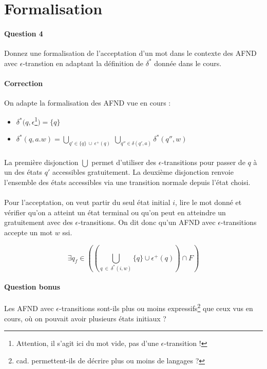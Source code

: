 \documentclass{article}[11pt]
\theoremstyle{definition}
\begin{document}
\section{Formalisation}

\paragraph*{Question 4} Donnez une formalisation de l'acceptation d'un mot dans le contexte des AFND avec $\epsilon$-transtion en adaptant la définition de $\delta^*$ donnée dans le cours.

\paragraph*{Correction} On adapte la formalisation des AFND vue en cours :
 
\begin{itemize}
\item $\delta^*(q,\epsilon$\footnote{Attention, il s'agit ici du mot vide, pas d'une $\epsilon$-transition !}$) = \{q\}$
\item $\delta^*(q,a.w) = \displaystyle\bigcup_{q' \in \{q\}~\cup~ \epsilon^+(q)}~\displaystyle\bigcup_{q'' \in \delta(q',a)} \delta^*(q'',w)$
\end{itemize}

\paragraph*{}La première disjonction $\bigcup$ permet d'utiliser des $\epsilon$-transitions pour passer de $q$ à un des états $q'$ accessibles gratuitement. La deuxième disjonction renvoie l'ensemble des états accessibles via une transition normale depuis l'état choisi.

\paragraph*{}Pour l'acceptation, on veut partir du seul état initial $i$, lire le mot donné et vérifier qu'on a atteint un état terminal ou qu'on peut en atteindre un gratuitement avec des $\epsilon$-transitions. On dit donc qu'un AFND avec $\epsilon$-transitions accepte un mot $w$ ssi. 

\[
\exists q_f \in ((\displaystyle\bigcup_{q~\in~\delta^*(i,w)} \{q\} \cup \epsilon^+(q)) \cap F)
\]


\paragraph*{Question bonus} Les AFND avec $\epsilon$-transitions sont-ils plus ou moins expressifs\footnote{cad. permettent-ils de décrire plus ou moins de langages ?} que ceux vus en cours, où on pouvait avoir plusieurs états initiaux ?
\end{document}
